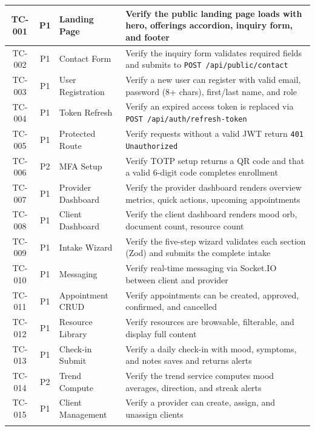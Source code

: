 \documentclass[12pt,letterpaper]{article}
\begin{document}
{\begin{longtable}{|c|c|>{\raggedright\arraybackslash}p{3cm}|>{\raggedright\arraybackslash}p{6.5cm}|}
TC-001 & P1 & Landing Page & Verify the public landing page loads with hero, offerings accordion, inquiry form, and footer \\
\hline
\rowcolor{TableRowAlt}
TC-002 & P1 & Contact Form & Verify the inquiry form validates required fields and submits to \texttt{POST /api/public/contact} \\
\hline
TC-003 & P1 & User Registration & Verify a new user can register with valid email, password (8+ chars), first/last name, and role \\
\hline
\rowcolor{TableRowAlt}
TC-004 & P1 & Token Refresh & Verify an expired access token is replaced via \texttt{POST /api/auth/refresh-token} \\
\hline
TC-005 & P1 & Protected Route & Verify requests without a valid JWT return \texttt{401 Unauthorized} \\
\hline
\rowcolor{TableRowAlt}
TC-006 & P2 & MFA Setup & Verify TOTP setup returns a QR code and that a valid 6-digit code completes enrollment \\
\hline
TC-007 & P1 & Provider Dashboard & Verify the provider dashboard renders overview metrics, quick actions, upcoming appointments \\
\hline
\rowcolor{TableRowAlt}
TC-008 & P1 & Client Dashboard & Verify the client dashboard renders mood orb, document count, resource count \\
\hline
TC-009 & P1 & Intake Wizard & Verify the five-step wizard validates each section (Zod) and submits the complete intake \\
\hline
\rowcolor{TableRowAlt}
TC-010 & P1 & Messaging & Verify real-time messaging via Socket.IO between client and provider \\
\hline
TC-011 & P1 & Appointment CRUD & Verify appointments can be created, approved, confirmed, and cancelled \\
\hline
\rowcolor{TableRowAlt}
TC-012 & P1 & Resource Library & Verify resources are browsable, filterable, and display full content \\
\hline
TC-013 & P1 & Check-in Submit & Verify a daily check-in with mood, symptoms, and notes saves and returns alerts \\
\hline
\rowcolor{TableRowAlt}
TC-014 & P2 & Trend Compute & Verify the trend service computes mood averages, direction, and streak alerts \\
\hline
TC-015 & P1 & Client Management & Verify a provider can create, assign, and unassign clients \\
\hline
\rowcolor{TableRowAlt}

\end{longtable}}
\end{document}
